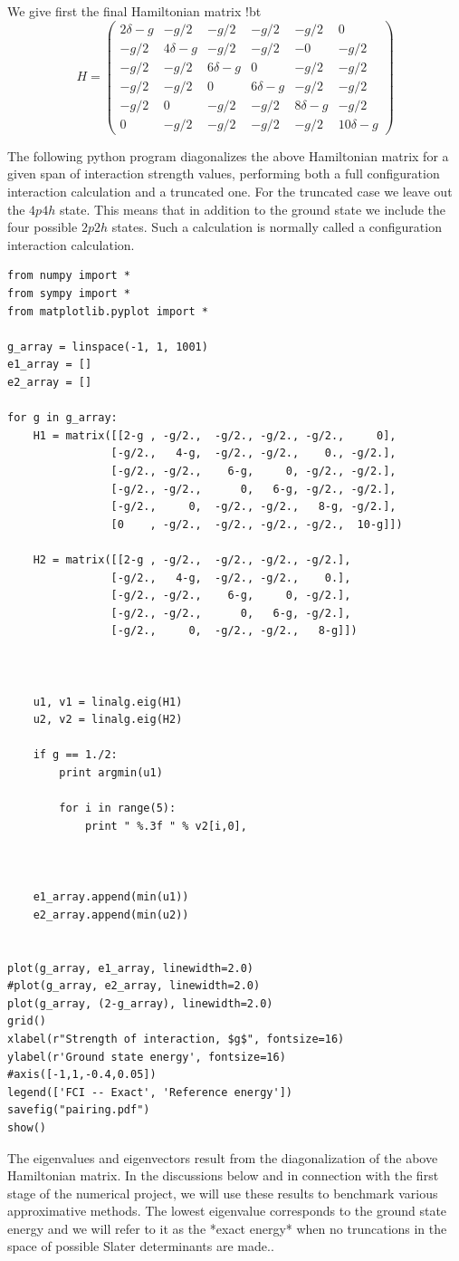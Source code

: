 \begin{prob}
We give first the final Hamiltonian matrix
!bt
\[
H = \left (
\begin{array}{cccccc}
2\delta -g & -g/2 & -g/2 & -g/2 & -g/2 & 0 \\
 -g/2 & 4\delta -g & -g/2 & -g/2 & -0 & -g/2 \\
-g/2 & -g/2 & 6\delta -g & 0 & -g/2 & -g/2 \\
 -g/2 & -g/2 & 0 & 6\delta-g & -g/2 & -g/2 \\
 -g/2 & 0 & -g/2 & -g/2 & 8\delta-g & -g/2 \\
0 & -g/2 & -g/2 & -g/2 & -g/2 & 10\delta -g
\end{array} \right )
\]

The following python program diagonalizes the above Hamiltonian matrix for a given span of interaction strength values, performing both a full configuration interaction calculation and a truncated one. For the truncated case we leave out the $4p4h$ state. This means that in addition to the ground state we include the four possible $2p2h$ states. Such a calculation is normally called a configuration interaction calculation.
\begin{lstlisting}
from numpy import *
from sympy import *
from matplotlib.pyplot import *

g_array = linspace(-1, 1, 1001)
e1_array = []
e2_array = []

for g in g_array:
	H1 = matrix([[2-g , -g/2.,  -g/2., -g/2., -g/2.,     0],
		        [-g/2.,   4-g,  -g/2., -g/2.,    0., -g/2.],
		        [-g/2., -g/2.,    6-g,     0, -g/2., -g/2.],
				[-g/2., -g/2.,      0,   6-g, -g/2., -g/2.],
				[-g/2.,     0,  -g/2., -g/2.,   8-g, -g/2.],
				[0    , -g/2.,  -g/2., -g/2., -g/2.,  10-g]])

	H2 = matrix([[2-g , -g/2.,  -g/2., -g/2., -g/2.],
		        [-g/2.,   4-g,  -g/2., -g/2.,    0.],
		        [-g/2., -g/2.,    6-g,     0, -g/2.],
				[-g/2., -g/2.,      0,   6-g, -g/2.],
				[-g/2.,     0,  -g/2., -g/2.,   8-g]])



	u1, v1 = linalg.eig(H1)
	u2, v2 = linalg.eig(H2)

	if g == 1./2:
		print argmin(u1)

		for i in range(5):
			print " %.3f " % v2[i,0],



	e1_array.append(min(u1))
	e2_array.append(min(u2))


plot(g_array, e1_array, linewidth=2.0)
#plot(g_array, e2_array, linewidth=2.0)
plot(g_array, (2-g_array), linewidth=2.0)
grid()
xlabel(r"Strength of interaction, $g$", fontsize=16)
ylabel(r'Ground state energy', fontsize=16)
#axis([-1,1,-0.4,0.05])
legend(['FCI -- Exact', 'Reference energy'])
savefig("pairing.pdf")
show()
\end{lstlisting}
The eigenvalues and eigenvectors result from the diagonalization of the above Hamiltonian matrix.
In the discussions below and in connection with the first stage of the numerical project, we will use these results to benchmark various approximative methods.
The lowest eigenvalue corresponds to the ground state
energy and we will refer to it as the *exact energy* when no truncations in the space of possible Slater determinants are made..


\end{prob}
